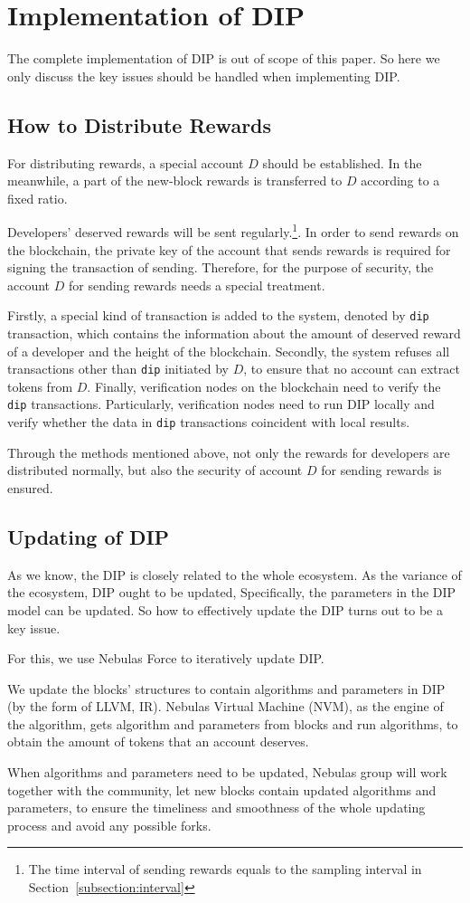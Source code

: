 \section{Implementation of DIP}
\noindent
The complete implementation of DIP is out of scope of this paper. So here we only discuss the key issues should be handled when implementing DIP\@.

\subsection{How to Distribute Rewards}
\noindent
For distributing rewards, a special account $D$ should be established. In the meanwhile, a part of the new-block rewards is transferred to $D$ according to a fixed ratio.

Developers' deserved rewards will be sent regularly.\footnote{The time interval of sending rewards equals to the sampling interval in Section~\ref{subsection:interval}}. In order to send rewards on the blockchain, the private key of the account that sends rewards is required for signing the transaction of sending. Therefore, for the purpose of security, the account $D$ for sending rewards needs a special treatment.

Firstly, a special kind of transaction is added to the system, denoted by \texttt{dip} transaction, which contains the information about the amount of deserved reward of a developer and the height of the blockchain. Secondly, the system refuses all transactions other than \texttt{dip} initiated by $D$, to ensure that no account can extract tokens from $D$. Finally, verification nodes on the blockchain  need to verify the \texttt{dip} transactions. Particularly, verification nodes need to run DIP locally and verify whether the data in \texttt{dip} transactions coincident with local results.

Through the methods mentioned above, not only the rewards for developers are distributed normally, but also the security of account $D$ for sending rewards is ensured.

\subsection{Updating of DIP}
\noindent
As we know, the DIP is closely related to the whole ecosystem. As the variance of the ecosystem, DIP ought to be updated, Specifically, the parameters in the DIP model can be updated. So how to effectively update the DIP turns out to be a key issue.

For this, we use Nebulas Force to iteratively update DIP\@.

We update the blocks' structures to contain algorithms and parameters in DIP (by the form of LLVM, IR). Nebulas Virtual Machine (NVM), as the engine of the algorithm, gets algorithm and parameters from blocks and run algorithms, to obtain the amount of tokens that an account deserves.

When algorithms and parameters need to be updated, Nebulas group will work together with the community, let new blocks contain updated algorithms and parameters, to ensure the timeliness and smoothness of the whole updating process and avoid any possible forks.
